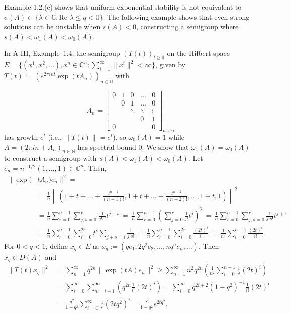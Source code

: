 \noindent Example 1.2.(c) shows that uniform exponential stability is not equivalent to \( \sigma(A) \subset \{\lambda \in \mathbb{C} : \text{Re } \lambda \leq q < 0 \} \). 
The following example shows that even strong solutions can be unstable when \( s(A) < 0 \), constructing a semigroup where \( s(A) < \omega_1(A) < \omega_0(A) \).

\begin{example}\label{ex:a4-1.6} In A-III, Example~1.4, the semigroup \( (T(t))_{t \geq 0} \) on the Hilbert space \( E = \{(x^1, x^2, ...), x^n \in \mathbb{C}^n : \sum_{i=1}^{\infty} \|x^i\|^2 < \infty\} \), given by \( T(t) := (e^{2\pi i n t} \exp(t A_n))_{n \in \mathbb{N}} \) with  

\[
A_n =
\begin{bmatrix}
0 & 1 & 0 & \dots & 0 \\
& 0 & 1 & \dots & 0 \\
& & \ddots & \ddots & \vdots \\
& & & 0 & 1 \\
0 & & & & 0
\end{bmatrix}_{n \times n}
\]
has growth \( e^t \) (i.e., \( \|T(t)\| = e^t \)), so \( \omega_0(A) = 1 \) while \( A = (2\pi i n + A_n)_{n \in \mathbb{N}} \) has spectral bound \( 0 \). 
We show that \( \omega_1(A) = \omega_0(A) \) to construct a semigroup with \( s(A) < \omega_1(A) < \omega_0(A) \). 
Let \( e_n = n^{-1/2} (1, ..., 1) \in \mathbb{C}^n \). 
Then,  
\begin{align*}
\|\exp(&t A_n) e_n\|^2 = \\
&= \frac{1}{n} \left\| (1 + t + \dots + \frac{t^{n-1}}{(n-1)!}, 1 + t + \dots + \frac{t^{n-2}}{(n-2)!}, \dots, 1+t, 1) \right\|^2 \\
&=
\frac{1}{n} \sum_{r=0}^{n-1} \sum_{j,s=0}^{r} \frac{1}{j!s!} t^{j+s} \, = \,
\frac{1}{n} \sum_{r=0}^{n-1} \left(\sum_{j=0}^{r} \frac{1}{j!} t^j \right)^2 
\, = \, \frac{1}{n} \sum_{r=0}^{n-1} \sum_{j,s=0}^{r} \frac{1}{j!s!} t^{j+s} \\
&= 
\frac{1}{n} \sum_{r=0}^{n-1} \sum_{i=0}^{2r} t^i \sum_{j+s=i} \frac{1}{j!s!} \,
= \, 
\frac{1}{n} \sum_{r=0}^{n-1} \sum_{i=0}^{2r} \frac{(2t)^i}{i!} \,  = \,  \frac{1}{n^2} \sum_{i=0}^{n-1} \frac{(2t)^i}{i!}.
\end{align*}
\noindent For \( 0 < q < 1 \), define \( x_q \in E \) as  
\(
x_q := (q e_1, 2q^2 e_2, ..., n q^n e_n, ...).
\)
Then $x_q \in D(A)$ and
\begin{align*}
\|T(t)x_q\|^2 & = \sum_{n=1}^{\infty} q^{2n} \| \exp(t A) e_n \|^2
\geq \sum_{n=1}^{\infty} n^2 q^{2n} \left(\frac{1}{n^2} \sum_{i=0}^{n-1}  \frac{1}{i!} (2t)^i \right)\\
&= \sum_{i=0}^{\infty} \sum_{n=i+1}^{\infty} \left( q^{2n} \frac{1}{i!} (2t)^i \right)
= \sum_{i=0}^{\infty} q^{2i+2} (1 - q^2)^{-1} \frac{1}{i!} (2t)^i \\
&= \frac{q^2}{1 - q^2} \sum_{i=0}^{\infty} \frac{1}{i!} (2t q^2)^i
= \frac{q^2}{1 - q^2} e^{2t q^2}.
\end{align*}


\end{example}
